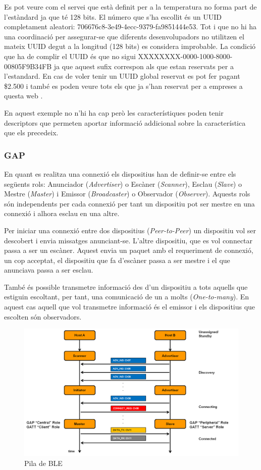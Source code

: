 Es pot veure com el servei que està definit per a la temperatura no forma part de l'estàndard ja que té 128 bits. El número que s'ha escollit és un UUID completament aleatori: 706676c8-3e49-4ecc-9379-fa9851444e53. Tot i que no hi ha una coordinació per assegurar-se que diferents desenvolupadors no utilitzen el mateix UUID degut a la longitud (128 bits) es considera improbable. La condició que ha de complir el UUID és que no sigui XXXXXXXX-0000-1000-8000-00805F9B34FB ja que aquest sufix correspon als que estan reservats per a l'estandard. En cas de voler tenir un UUID global reservat es pot fer pagant \$2.500 i també es poden veure tots els que ja s'han reservat per a empreses a questa web \cite{reservedUUIDs}.

En aquest exemple no n'hi ha cap però les característiques poden tenir descriptors \cite{descriptors} que permeten aportar informació addicional sobre la característica que els precedeix.

\subsubsection{GAP}
En quant es realitza una connexió els dispositius han de definir-se entre els següents rols: Anunciador (\textit{Advertiser}) o Escàner (\textit{Scanner}), Esclau (\textit{Slave}) o Mestre (\textit{Master}) i Emissor (\textit{Broadcaster}) o Observador (\textit{Observer}).
Aquests rols són independents per cada connexió per tant un dispositiu pot ser mestre en una connexió i alhora esclau en una altre.

Per iniciar una connexió entre dos dispositius (\textit{Peer-to-Peer}) un dispositiu vol ser descobert i envia missatges anunciant-se. L'altre dispositiu, que es vol connectar passa a ser un escàner. Aquest envia un paquet amb el requeriment de connexió, un cop acceptat, el dispositiu que fa d'escàner passa a ser mestre i el que anunciava passa a ser esclau.

També és possible transmetre informació des d'un dispositiu a tots aquells que estiguin escoltant, per tant, una comunicació de un a molts (\textit{One-to-many}). En aquest cas aquell que vol transmetre informació és el emissor i els dispositius que escolten són observadors.

\begin{figure}[h]
	\begin{center}
		\includegraphics[width=1\textwidth]{./images/rols_unicast.png}
		\caption{Pila de BLE \cite{ble_stack}}
		\label{ble_stack}
	\end{center}
\end{figure}

